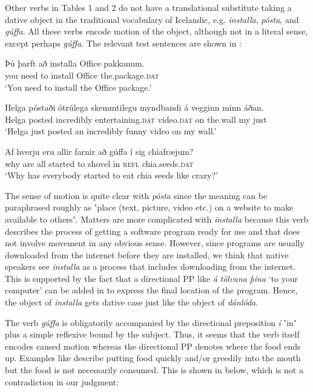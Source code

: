 \documentclass[output=paper,modfonts,nonflat,colorlinks,citecolor=brown]{langsci/langscibook}
\begin{document}
{Other verbs in Tables 1 and 2 do not have a translational substitute taking a dative object in the traditional vocabulary of Icelandic, e.g. \textit{installa}, \textit{pósta}, and \textit{gúffa}. All these verbs encode motion of the object, although not in a literal sense, except perhaps \textit{gúffa}. The relevant test sentences are shown in : 


\ea%
    \label{ex:jonsson:3}
\ea\label{ex:jonsson:3a}
\gll   Þú   þarft   að   installa   Office   pakkanum.\\
     you   need   to   install   Office   the.package.\textsc{dat}\\
\glt `You need to install the Office package.'
 
\ex\label{ex:jonsson:3b}
\gll   Helga  póstaði  ótrúlega  skemmtilegu  myndbandi  á  vegginn  minn  áðan.\\
 Helga   posted   incredibly   entertaining.\textsc{dat}   video.\textsc{dat}   on   the.wall   my   just\\
\glt `Helga just posted an incredibly funny video on my wall.'
 

\ex\label{ex:jonsson:3c}
\gll   Af hverju  eru  allir  farnir  að  gúffa  í  sig  chiafræjum?\\
 why   are   all   started   to   shovel   in   \textsc{refl}   chia.seeds.\textsc{dat}\\
\glt `Why has everybody started to eat chia seeds like crazy?'
\z
\z

The sense of motion is quite clear with \textit{pósta} since the meaning can be paraphrased roughly as ʽplace (text, picture, video etc.) on a website to make available to othersʼ. Matters are more complicated with \textit{installa} because this verb describes the process of getting a software program ready for use and that does not involve movement in any obvious sense. However, since programs are usually downloaded from the internet before they are installed, we think that native speakers see \textit{installa} as a process that includes downloading from the internet. This is supported by the fact that a directional PP like \textit{á} \textit{tölvuna} \textit{þína} ‘to your computer’ can be added in  to express the final location of the program. Hence, the object of \textit{installa} gets dative case just like the object of \textit{dánlóda}. 

The verb \textit{gúffa} is obligatorily accompanied by the directional preposition \textit{í} ʽinʼ plus a simple reflexive bound by the subject. Thus, it seems that the verb itself encodes caused motion whereas the directional PP denotes where the food ends up. Examples like  describe putting food quickly and/or greedily into the mouth but the food is not necessarily consumed. This is shown in  below, which is not a contradiction in our judgment: 

}
\end{document}
